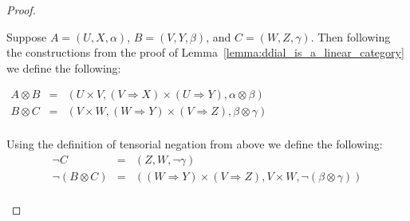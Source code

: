 \begin{proof}
\begin{itemize}
    Suppose $A = (U,X,\alpha)$, $B = (V,Y,\beta)$, and $C =
    (W,Z,\gamma)$.  Then following the constructions from the proof of
    Lemma~\ref{lemma:ddial_is_a_linear_category} we define the
    following:
    \begin{center}
      \begin{math}
        \begin{array}{lll}
          A \otimes B & = & (U \times V, (V \Rightarrow X) \times (U \Rightarrow Y), \alpha \otimes \beta)\\
          B \otimes C & = & (V \times W, (W \Rightarrow Y) \times (V \Rightarrow Z), \beta \otimes \gamma)\\
        \end{array}
      \end{math}
    \end{center}
    Using the definition of tensorial negation from above we define the following:
    \[
    \begin{array}{lll}
      \lnot C & = & (Z,W,\lnot \gamma)\\
      \lnot (B \otimes C) & = & ((W \Rightarrow Y) \times (V \Rightarrow Z), V \times W, \lnot (\beta \otimes \gamma))\\
    \end{array}
    \]


\end{itemize}
\end{proof}
